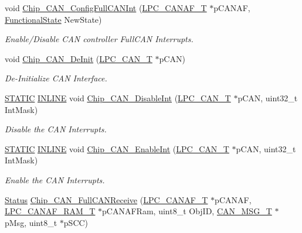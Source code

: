 \begin{DoxyCompactItemize}
\item 
void \hyperlink{group__CAN__17XX__40XX_ga90ebd27acbebb24951b5707abca13220}{Chip\+\_\+\+C\+A\+N\+\_\+\+Config\+Full\+C\+A\+N\+Int} (\hyperlink{structLPC__CANAF__T}{L\+P\+C\+\_\+\+C\+A\+N\+A\+F\+\_\+T} $\ast$p\+C\+A\+N\+AF, \hyperlink{group__LPC__Types__Public__Types_gac9a7e9a35d2513ec15c3b537aaa4fba1}{Functional\+State} New\+State)
\begin{DoxyCompactList}\small\item\em Enable/\+Disable C\+AN controller Full\+C\+AN Interrupts. \end{DoxyCompactList}\item 
void \hyperlink{group__CAN__17XX__40XX_ga7f490bb9d12b30243264cd06feb795db}{Chip\+\_\+\+C\+A\+N\+\_\+\+De\+Init} (\hyperlink{structLPC__CAN__T}{L\+P\+C\+\_\+\+C\+A\+N\+\_\+T} $\ast$p\+C\+AN)
\begin{DoxyCompactList}\small\item\em De-\/\+Initialize C\+AN Interface. \end{DoxyCompactList}\item 
\hyperlink{group__LPC__Types__Public__Macros_ga10b2d890d871e1489bb02b7e70d9bdfb}{S\+T\+A\+T\+IC} \hyperlink{group__LPC__Types__Public__Types_ga2eb6f9e0395b47b8d5e3eeae4fe0c116}{I\+N\+L\+I\+NE} void \hyperlink{group__CAN__17XX__40XX_ga5dcf82fd6e7df4b699e32249eb3021dd}{Chip\+\_\+\+C\+A\+N\+\_\+\+Disable\+Int} (\hyperlink{structLPC__CAN__T}{L\+P\+C\+\_\+\+C\+A\+N\+\_\+T} $\ast$p\+C\+AN, uint32\+\_\+t Int\+Mask)
\begin{DoxyCompactList}\small\item\em Disable the C\+AN Interrupts. \end{DoxyCompactList}\item 
\hyperlink{group__LPC__Types__Public__Macros_ga10b2d890d871e1489bb02b7e70d9bdfb}{S\+T\+A\+T\+IC} \hyperlink{group__LPC__Types__Public__Types_ga2eb6f9e0395b47b8d5e3eeae4fe0c116}{I\+N\+L\+I\+NE} void \hyperlink{group__CAN__17XX__40XX_ga9b5dfccc60fec9c7da50ea7ee3515a63}{Chip\+\_\+\+C\+A\+N\+\_\+\+Enable\+Int} (\hyperlink{structLPC__CAN__T}{L\+P\+C\+\_\+\+C\+A\+N\+\_\+T} $\ast$p\+C\+AN, uint32\+\_\+t Int\+Mask)
\begin{DoxyCompactList}\small\item\em Enable the C\+AN Interrupts. \end{DoxyCompactList}\item 
\hyperlink{group__LPC__Types__Public__Types_ga67a0db04d321a74b7e7fcfd3f1a3f70b}{Status} \hyperlink{group__CAN__17XX__40XX_ga4029c0d9ce2f898bf911e0e49b570f5b}{Chip\+\_\+\+C\+A\+N\+\_\+\+Full\+C\+A\+N\+Receive} (\hyperlink{structLPC__CANAF__T}{L\+P\+C\+\_\+\+C\+A\+N\+A\+F\+\_\+T} $\ast$p\+C\+A\+N\+AF, \hyperlink{structLPC__CANAF__RAM__T}{L\+P\+C\+\_\+\+C\+A\+N\+A\+F\+\_\+\+R\+A\+M\+\_\+T} $\ast$p\+C\+A\+N\+A\+F\+Ram, uint8\+\_\+t Obj\+ID, \hyperlink{structCAN__MSG__T}{C\+A\+N\+\_\+\+M\+S\+G\+\_\+T} $\ast$p\+Msg, uint8\+\_\+t $\ast$p\+S\+CC)

\end{DoxyCompactItemize}
